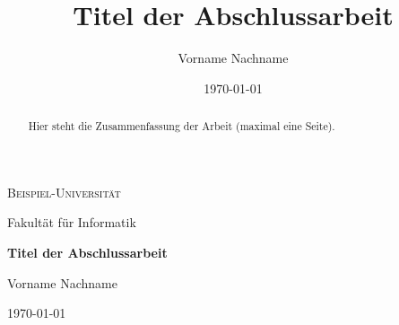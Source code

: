 \documentclass[12pt,a4paper,ngerman]{scrreprt}
\title{Titel der Abschlussarbeit}
\author{Vorname Nachname}
\date{\today}
\begin{document}
\begin{titlepage}
  \centering
  {\scshape\LARGE Beispiel-Universität\par}
  {\large Fakultät für Informatik\par}
  \vspace{3cm}
  {\huge\bfseries Titel der Abschlussarbeit\par}
  \vspace{2cm}
  {\Large Vorname Nachname\par}
  \vfill
  {\large \today\par}
\end{titlepage}

\begin{abstract}
  Hier steht die Zusammenfassung der Arbeit (maximal eine Seite).
\end{abstract}

\tableofcontents
\listoffigures
\listoftables

\mainmatter



\appendix


\backmatter
\printbibliography[title={Literaturverzeichnis}]
\end{document}
